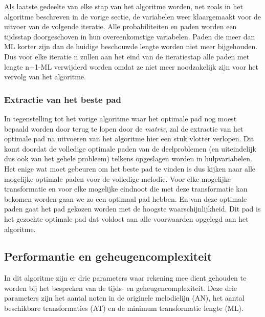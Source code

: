 Als laatste gedeelte van elke stap van het algoritme worden, net zoals in het algoritme beschreven in de vorige sectie, de variabelen weer klaargemaakt voor de uitvoer van de volgende iteratie. Alle probabiliteiten en paden worden een tijdsstap doorgeschoven in hun overeenkomstige variabelen. Paden die meer dan ML korter zijn dan de huidige beschouwde lengte worden niet meer bijgehouden. Dus voor elke iteratie n zullen aan het eind van de iteratiestap alle paden met lengte n+1-ML verwijderd worden omdat ze niet meer noodzakelijk zijn voor het vervolg van het algoritme.

\subsubsection{Extractie van het beste pad}
In tegenstelling tot het vorige algoritme waar het optimale pad nog moest bepaald worden door terug te lopen door de \textit{matrix}, zal de extractie van het optimale pad na uitvoeren van het algoritme hier een stuk vlotter verlopen. Dit komt doordat de volledige optimale paden van de deelproblemen (en uiteindelijk dus ook van het gehele probleem) telkens opgeslagen worden in hulpvariabelen. Het enige wat moet gebeuren om het beste pad te vinden is dus kijken naar alle mogelijke optimale paden voor de volledige melodie. Voor elke mogelijke transformatie en voor elke mogelijke eindnoot die met deze transformatie kan bekomen worden gaan we zo een optimaal pad hebben. En van deze optimale paden gaat het pad gekozen worden met de hoogste waarschijnlijkheid. Dit pad is het gezochte optimale pad dat voldoet aan alle voorwaarden opgelegd aan het algoritme.

\subsection{Performantie en geheugencomplexiteit}
In dit algoritme zijn er drie parameters waar rekening mee dient gehouden te worden bij het bespreken van de tijds- en geheugencomplexiteit. Deze drie parameters zijn het aantal noten in de originele melodielijn (AN), het aantal beschikbare transformaties (AT) en de minimum transformatie lengte (ML).

